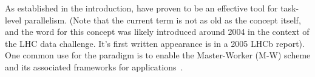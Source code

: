 \documentclass{sig-alternate}
\begin{document}





As established in the introduction, \pilotjobs have proven to be an
effective tool for task-level parallelism.
(Note that the current term \textit{\pilotjob} is not as old as the concept
itself, and the word \pilot for this concept was likely introduced around 2004
in the context of the LHC data challenge. It's first written appearance is in a
2005 LHCb report\cite{lhcb2005}). 
One common use for the \pilotjob paradigm is to enable the Master-Worker (M-W)
scheme and its associated frameworks for
applications~\cite{Shao:2000:masterslave}.
\end{document}

